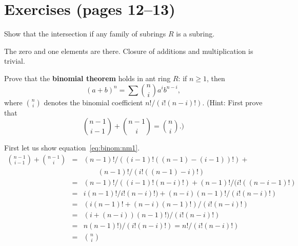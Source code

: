 
\section{Exercises (pages 12--13)}

\begin{myenumerate}


\item
\begin{excopy}
Show that the intersection if any family of subrings $R$ is a subring.
\end{excopy}

The zero and one elements are there.
Closure of additions and multiplication is trivial.

\item
\begin{excopy}
Prove that the
\label{ex:binomial}
\textbf{binomial theorem} holds in ant ring $R$: if \(n\geq 1\), then
\begin{equation}\label{eq:binom}
(a+b)^n = \sum {\binom{n}{i}} a^ib^{n-i},
\end{equation}
where \(\binom{n}{i}\)
denotes the binomial coefficient \(n!/(i!(n-i)!)\). (Hint: First prove
that
\begin{equation} \label{eq:binom:nm1}
\binom{n-1}{i-1} + \binom{n-1}{i} = \binom{n}{i}.)
\end{equation}
\end{excopy}

First let us show equation~\ref{eq:binom:nm1}.
\begin{eqnarray*}
\binom{n-1}{i-1} + \binom{n-1}{i}
  & = & (n-1)!/((i-1)!((n-1)-(i-1))!) + \\
  &   & \qquad (n-1)!/(i!((n-1)-i)!) \\
  & = & (n-1)!/((i-1)!(n-i)!) + (n-1)!/(i!((n-i-1)!) \\
  & = & i(n-1)!/i!(n-i)!) + (n-i)(n-1)!/(i!(n-i)!) \\
  & = & (i(n-1)! + (n-i)(n-1)!)/(i!(n-i)!) \\
  & = & (i + (n-i))(n-1)!)/(i!(n-i)!) \\
  & = & n(n-1)!)/(i!(n-i)!) = n!/(i!(n-i)!) \\
  & = & \binom{n}{i}
\end{eqnarray*}


\end{myenumerate}
